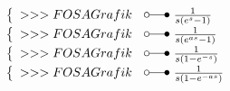 \[\begin{array}{@{}l@{ ~ \laplace ~ }l@{}}
\left\lbrace\begin{array}{l}
>>>FOSA Grafik \\
\end{array}\right. &
    \frac{1}{s (e^s - 1)} \\
\left\lbrace\begin{array}{l}
>>>FOSA Grafik \\
\end{array}\right. &
    \frac{1}{s (e^{as} - 1)} \\
\left\lbrace\begin{array}{l}
>>>FOSA Grafik \\
\end{array}\right. &
    \frac{1}{s (1 - e^{-s})} \\
\left\lbrace\begin{array}{l}
>>>FOSA Grafik \\
\end{array}\right. &
    \frac{1}{s (1 - e^{-as})} \\
\end{array} \]

